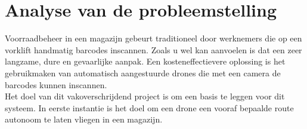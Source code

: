 \chapter{Analyse van de probleemstelling}
Voorraadbeheer in een magazijn gebeurt traditioneel door werknemers die op een vorklift handmatig barcodes inscannen. Zoals u wel kan aanvoelen is dat een zeer langzame, dure en gevaarlijke aanpak. Een kosteneffectievere oplossing is het gebruikmaken van automatisch aangestuurde drones die met een camera de barcodes kunnen inscannen.\\

Het doel van dit vakoverschrijdend project is om een basis te leggen voor dit systeem. In eerste instantie is het doel om een drone een vooraf bepaalde route autonoom te laten vliegen in een magazijn.